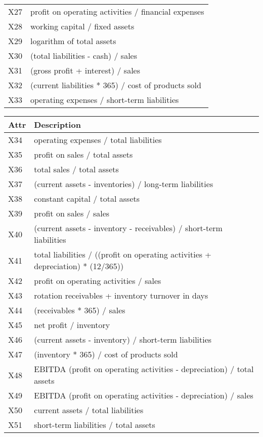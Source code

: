 \begin{table*}
\begin{tabular}[t]{|p{0.8cm}|p{6cm}| }
    X27	&	profit on operating activities / financial expenses \\
    X28	&	working capital / fixed assets \\
    X29	&	logarithm of total assets \\
    X30	&	(total liabilities - cash) / sales \\
    X31	&	(gross profit + interest) / sales \\
    X32	&	(current liabilities * 365) / cost of products sold \\
    X33	&	operating expenses / short-term liabilities \\
     \hline
\end{tabular}
\begin{tabular}[t]{|p{0.8cm}|p{6cm}| }
     \hline
     \textbf{Attr} & \textbf{Description} \\
     \hline
    X34	&	operating expenses / total liabilities \\
    X35	&	profit on sales / total assets \\
    X36	&	total sales / total assets \\
    X37	&	(current assets - inventories) / long-term liabilities \\
    X38	&	constant capital / total assets \\
    X39	&	profit on sales / sales \\
    X40	&	(current assets - inventory - receivables) / short-term liabilities \\
    X41	&	total liabilities / ((profit on operating activities + depreciation) * (12/365)) \\
    X42	&	profit on operating activities / sales \\
    X43	&	rotation receivables + inventory turnover in days \\
    X44	&	(receivables * 365) / sales \\
    X45	&	net profit / inventory \\
    X46	&	(current assets - inventory) / short-term liabilities \\
    X47	&	(inventory * 365) / cost of products sold \\
    X48	&	EBITDA (profit on operating activities - depreciation) / total assets \\
    X49	&	EBITDA (profit on operating activities - depreciation) / sales \\
    X50	&	current assets / total liabilities \\
    X51	&	short-term liabilities / total assets \\

\end{tabular}
\end{table*}
